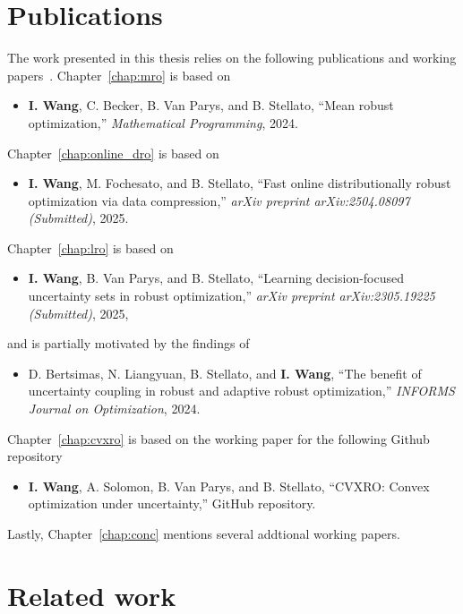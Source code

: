 \section{Publications}
\label{sec:publications}
The work presented in this thesis relies on the following publications and working papers~\cite{mro,online_mro,coupling,lropt,lropt_package}.
Chapter~\ref{chap:mro} is based on 
\begin{itemize}
  \item {\bf I. Wang}, C. Becker, B. Van Parys, and B. Stellato, “Mean robust optimization,” {\it Mathematical Programming}, 2024.
\end{itemize}
Chapter~\ref{chap:online_dro} is based on 
\begin{itemize}
  \item {\bf I. Wang}, M. Fochesato, and B. Stellato, “Fast online distributionally robust optimization via data compression,” {\it arXiv preprint arXiv:2504.08097 (Submitted)}, 2025.
\end{itemize}
Chapter~\ref{chap:lro} is based on 
\begin{itemize}
  \item {\bf I. Wang}, B. Van Parys, and B. Stellato, “Learning decision-focused uncertainty sets in robust optimization,” {\it arXiv preprint
arXiv:2305.19225 (Submitted)}, 2025,
\end{itemize}
and is partially motivated by the findings of 
\begin{itemize}
  \item D. Bertsimas, N. Liangyuan, B. Stellato, and {\bf I. Wang}, “The benefit of uncertainty coupling in robust and adaptive robust optimization,” {\it INFORMS Journal on Optimization}, 2024.
\end{itemize}
Chapter~\ref{chap:cvxro} is based on the working paper for the following Github repository
\begin{itemize}
  \item {\bf I. Wang}, A. Solomon, B. Van Parys, and B. Stellato, “CVXRO: Convex optimization under uncertainty,” GitHub repository.
\end{itemize}

Lastly, Chapter~\ref{chap:conc} mentions several addtional working papers. 

\section{Related work}
\label{sec:related_work_intro}

